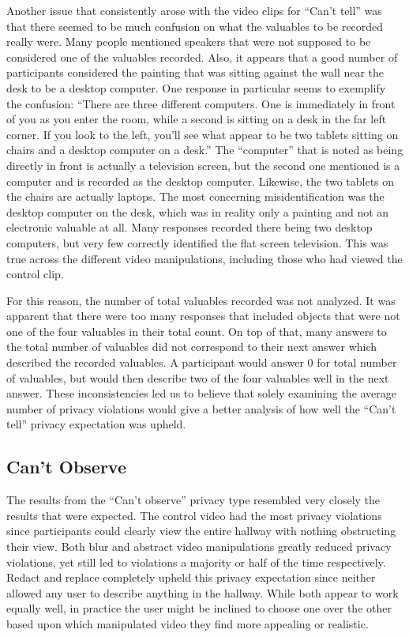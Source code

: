 \documentclass{acm_proc_article-sp}
\begin{document}
 Another issue that consistently arose with the video clips for ``Can't tell'' was that there seemed to be much confusion on what the valuables to be recorded really were. Many people mentioned speakers that were not supposed to be considered one of the valuables recorded. Also, it appears that a good number of participants considered the painting that was sitting against the wall near the desk to be a desktop computer. One response in particular seems to exemplify the confusion:
``There are three different computers. One is immediately in front of you as you enter the room, while a second is sitting on a desk in the far left corner. If you look to the left, you'll see what appear to be two tablets sitting on chairs and a desktop computer on a desk.'' The ``computer'' that is noted as being directly in front is actually a television screen, but the second one mentioned is a computer and is recorded as the desktop computer. Likewise, the two tablets on the chairs are actually laptops. The most concerning misidentification was the desktop computer on the desk, which was in reality only a painting and not an electronic valuable at all. Many responses recorded there being two desktop computers, but very few correctly identified the flat screen television. This was true across the different video manipulations, including those who had viewed the control clip.

For this reason, the number of total valuables recorded was not analyzed. It was apparent that there were too many responses that included objects that were not one of the four valuables in their total count. On top of that, many answers to the total number of valuables did not correspond to their next answer which described the recorded valuables. A participant would answer 0 for total number of valuables, but would then describe two of the four valuables well in the next answer. These inconsistencies led us to believe that solely examining the average number of privacy violations would give a better analysis of how well the ``Can't tell'' privacy expectation was upheld. 

\subsection{Can't Observe}
The results from the ``Can't observe'' privacy type resembled very closely the results that were expected. The control video had the most privacy violations since participants could clearly view the entire hallway with nothing obstructing their view. Both blur and abstract video manipulations greatly reduced privacy violations, yet still led to violations a majority or half of the time respectively. Redact and replace completely upheld this privacy expectation since neither allowed any user to describe anything in the hallway. While both appear to work equally well, in practice the user might be inclined to choose one over the other based upon which manipulated video they find more appealing or realistic. 
\end{document}
